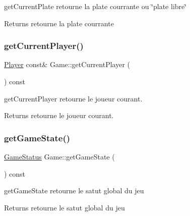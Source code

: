 get\+Current\+Plate retourne la plate courrante ou \char`\"{}plate libre\char`\"{} 

\begin{DoxyReturn}{Returns}
retourne la plate courrante 
\end{DoxyReturn}
\mbox{\label{class_game_a202099c9ce99f80dc84091761d3292eb}} 
\subsubsection{\texorpdfstring{getCurrentPlayer()}{getCurrentPlayer()}}
{\footnotesize\ttfamily \mbox{\hyperlink{class_player}{Player}} const\& Game\+::get\+Current\+Player (\begin{DoxyParamCaption}{ }\end{DoxyParamCaption}) const\hspace{0.3cm}{\ttfamily [inline]}}



get\+Current\+Player retourne le joueur courant. 

\begin{DoxyReturn}{Returns}
retourne le joueur courant. 
\end{DoxyReturn}
\mbox{\label{class_game_abfd280f5fdc614d8542058ca7ac82ea5}} 
\subsubsection{\texorpdfstring{getGameState()}{getGameState()}}
{\footnotesize\ttfamily \mbox{\hyperlink{class_game_ad7fdf24774752f47b6a14827e8bbc073}{Game\+Status}} Game\+::get\+Game\+State (\begin{DoxyParamCaption}{ }\end{DoxyParamCaption}) const\hspace{0.3cm}{\ttfamily [inline]}}



get\+Game\+State retourne le satut global du jeu 

\begin{DoxyReturn}{Returns}
retourne le satut global du jeu 
\end{DoxyReturn}
\mbox{\label{class_game_a669625eaa5a522e8012a3a5ea4bb1a39}} 
